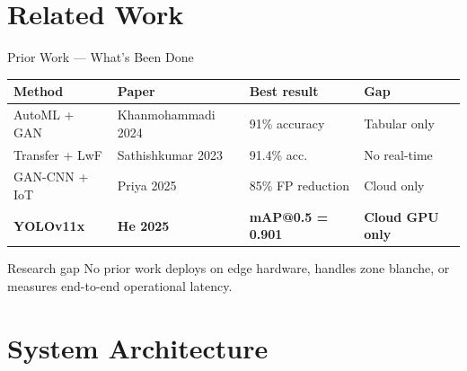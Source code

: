 \documentclass[aspectratio=169,10pt]{beamer}
\begin{document}
\section{Related Work}

\begin{frame}{Prior Work — What's Been Done}
  \begin{table}
    \centering\small
    \begin{tabular}{llll}
      \toprule
      \textbf{Method} & \textbf{Paper} & \textbf{Best result} & \textbf{Gap} \\
      \midrule
      AutoML + GAN & Khanmohammadi 2024 & 91\% accuracy & Tabular only \\
      Transfer + LwF & Sathishkumar 2023 & 91.4\% acc. & No real-time \\
      GAN-CNN + IoT & Priya 2025 & 85\% FP reduction & Cloud only \\
      \textbf{YOLOv11x} & \textbf{He 2025} & \textbf{mAP@0.5 = 0.901} & \textbf{Cloud GPU only} \\
      \bottomrule
    \end{tabular}
  \end{table}
  \vspace{0.4em}
  \begin{alertblock}{Research gap}
    No prior work deploys on edge hardware, handles zone blanche, or
    measures end-to-end operational latency.
  \end{alertblock}
\end{frame}

\section{System Architecture}
\end{document}
